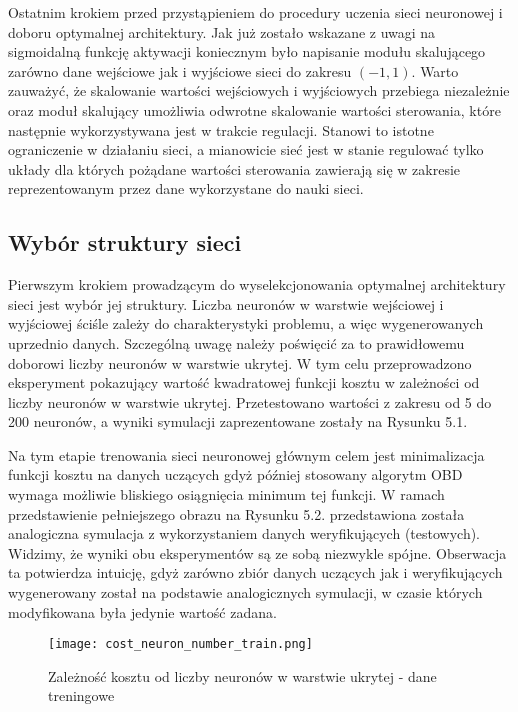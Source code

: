\par Ostatnim krokiem przed przystąpieniem do procedury uczenia sieci neuronowej i doboru optymalnej architektury. Jak już zostało wskazane z uwagi na sigmoidalną funkcję aktywacji koniecznym było napisanie modułu skalującego zarówno dane wejściowe jak i wyjściowe sieci do zakresu \( (-1,1) \). Warto zauważyć, że skalowanie wartości wejściowych i wyjściowych przebiega niezależnie oraz moduł skalujący umożliwia odwrotne skalowanie wartości sterowania, które następnie wykorzystywana jest w trakcie regulacji. Stanowi to istotne ograniczenie w działaniu sieci, a mianowicie sieć jest w stanie regulować tylko układy dla których pożądane wartości sterowania zawierają się w zakresie reprezentowanym przez dane wykorzystane do nauki sieci.  

\subsection{Wybór struktury sieci}
Pierwszym krokiem prowadzącym do wyselekcjonowania optymalnej architektury sieci jest wybór jej struktury. Liczba neuronów w warstwie wejściowej i wyjściowej ściśle zależy do charakterystyki problemu, a więc wygenerowanych uprzednio danych. Szczególną uwagę należy poświęcić za to prawidłowemu doborowi liczby neuronów w warstwie ukrytej. W tym celu przeprowadzono eksperyment pokazujący wartość kwadratowej funkcji kosztu w zależności od liczby neuronów w warstwie ukrytej. Przetestowano wartości z zakresu od 5 do 200 neuronów, a wyniki symulacji zaprezentowane zostały na Rysunku 5.1. 
\par Na tym etapie trenowania sieci neuronowej głównym celem jest minimalizacja funkcji kosztu na danych uczących gdyż później stosowany algorytm OBD wymaga możliwie bliskiego osiągnięcia minimum tej funkcji. W ramach przedstawienie pełniejszego obrazu na Rysunku 5.2. przedstawiona została analogiczna symulacja z wykorzystaniem danych weryfikujących (testowych). Widzimy, że wyniki obu eksperymentów są ze sobą niezwykle spójne. Obserwacja ta potwierdza intuicję, gdyż zarówno zbiór danych uczących jak i weryfikujących wygenerowany został na podstawie analogicznych symulacji, w czasie których modyfikowana była jedynie wartość zadana. 

\begin{figure}[h]
  \label{fig:Koszt-liczba-neuronow-treningowe}
  \centering \texttt{[image: cost\_neuron\_number\_train.png]}
  \caption{Zależność kosztu od liczby neuronów w warstwie ukrytej - dane treningowe}
\end{figure}

